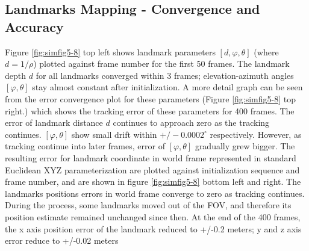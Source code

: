 \subsection{Landmarks Mapping - Convergence and Accuracy}
Figure \ref{fig:simfig5-8} top left shows landmark parameters $[d, \varphi ,\theta]$ (where $d=1/\rho $) plotted against frame number for the first 50 frames. The landmark depth $d$ for all landmarks converged within 3 frames; elevation-azimuth angles $[\varphi ,\theta]$ stay almost constant after initialization. A more detail graph can be seen from the error convergence plot for these parameters (Figure \ref{fig:simfig5-8} top right.) which shows the tracking error of these parameters for 400 frames. The error of landmark distance $d$ continues to approach zero as the tracking continues. $[\varphi ,\theta]$ show small drift within $+/-0.0002^{\circ}$ respectively. However, as tracking continue into later frames, error of $[\varphi ,\theta]$ gradually grew bigger. The resulting error for landmark coordinate in world frame represented in standard Euclidean XYZ parameterization are plotted against initialization sequence and frame number, and are shown in figure \ref{fig:simfig5-8} bottom left and right. The landmarks positions errors in world frame converge to zero as tracking continues. During the process, some landmarks moved out of the FOV, and therefore its position estimate remained unchanged since then. At the end of the 400 frames, the x axis position error of the landmark reduced to +/-0.2 meters; y and z axis error reduce to +/-0.02 meters

